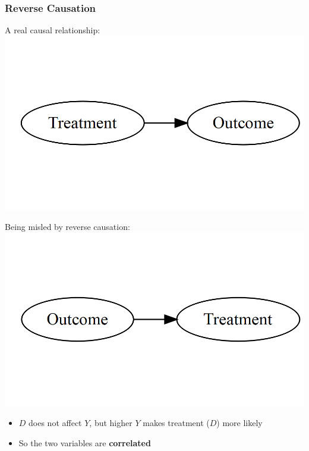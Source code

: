 \documentclass[xcolor=x11names,compress]{beamer}\usepackage[]{graphicx}\usepackage[]{color}
\makeatletter
\def\maxwidth{ %
  \ifdim\Gin@nat@width>\linewidth
    \linewidth
  \else
    \Gin@nat@width
  \fi
}
\newenvironment{knitrout}{}{} %
\renewcommand{\(}{\begin{columns}}
\renewcommand{\)}{\end{columns}}
\newcommand{\<}[1]{\begin{column}{#1}}
\renewcommand{\>}{\end{column}}
\makeatother
\begin{document}
\begin{frame}
\frametitle{Reverse Causation}
\begin{multicols}{2}
A real causal relationship:
\begin{knitrout}
\color{fgcolor}
\includegraphics[width=\maxwidth]{figure/explanation5-1} 

\end{knitrout}
\columnbreak
\pause
Being misled by reverse causation:
\begin{knitrout}
\color{fgcolor}
\includegraphics[width=\maxwidth]{figure/explanation6-1} 

\end{knitrout}
\end{multicols}
\begin{itemize}
\pause
\item $D$ does not affect $Y$, but higher $Y$ makes treatment ($D$) more likely
\pause
\item So the two variables are \textbf{correlated}
\end{itemize}
\end{frame}
\end{document}
